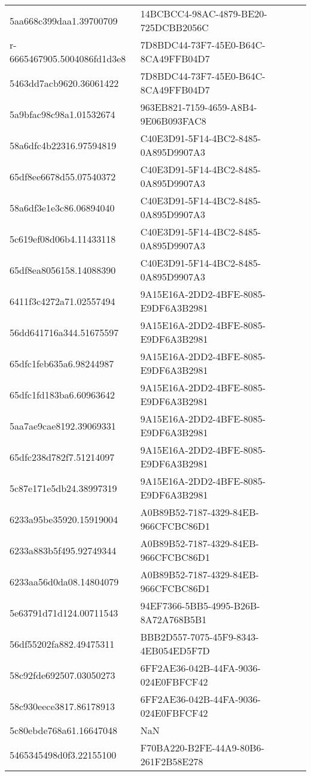 \begin{tabular}{ll}
5aa668c399daa1.39700709 & 14BCBCC4-98AC-4879-BE20-725DCBB2056C \\
r-6665467905.5004086fd1d3e8 & 7D8BDC44-73F7-45E0-B64C-8CA49FFB04D7 \\
5463dd7acb9620.36061422 & 7D8BDC44-73F7-45E0-B64C-8CA49FFB04D7 \\
5a9bfac98c98a1.01532674 & 963EB821-7159-4659-A8B4-9E06B093FAC8 \\
58a6dfc4b22316.97594819 & C40E3D91-5F14-4BC2-8485-0A895D9907A3 \\
65df8ee6678d55.07540372 & C40E3D91-5F14-4BC2-8485-0A895D9907A3 \\
58a6df3e1e3c86.06894040 & C40E3D91-5F14-4BC2-8485-0A895D9907A3 \\
5c619ef08d06b4.11433118 & C40E3D91-5F14-4BC2-8485-0A895D9907A3 \\
65df8ea8056158.14088390 & C40E3D91-5F14-4BC2-8485-0A895D9907A3 \\
6411f3c4272a71.02557494 & 9A15E16A-2DD2-4BFE-8085-E9DF6A3B2981 \\
56dd641716a344.51675597 & 9A15E16A-2DD2-4BFE-8085-E9DF6A3B2981 \\
65dfc1feb635a6.98244987 & 9A15E16A-2DD2-4BFE-8085-E9DF6A3B2981 \\
65dfc1fd183ba6.60963642 & 9A15E16A-2DD2-4BFE-8085-E9DF6A3B2981 \\
5aa7ae9cae8192.39069331 & 9A15E16A-2DD2-4BFE-8085-E9DF6A3B2981 \\
65dfc238d782f7.51214097 & 9A15E16A-2DD2-4BFE-8085-E9DF6A3B2981 \\
5c87e171e5db24.38997319 & 9A15E16A-2DD2-4BFE-8085-E9DF6A3B2981 \\
6233a95be35920.15919004 & A0B89B52-7187-4329-84EB-966CFCBC86D1 \\
6233a883b5f495.92749344 & A0B89B52-7187-4329-84EB-966CFCBC86D1 \\
6233aa56d0da08.14804079 & A0B89B52-7187-4329-84EB-966CFCBC86D1 \\
5e63791d71d124.00711543 & 94EF7366-5BB5-4995-B26B-8A72A768B5B1 \\
56df55202fa882.49475311 & BBB2D557-7075-45F9-8343-4EB054ED5F7D \\
58c92fde692507.03050273 & 6FF2AE36-042B-44FA-9036-024E0FBFCF42 \\
58c930eece3817.86178913 & 6FF2AE36-042B-44FA-9036-024E0FBFCF42 \\
5c80ebde768a61.16647048 & NaN \\
5465345498d0f3.22155100 & F70BA220-B2FE-44A9-80B6-261F2B58E278 \\

\end{tabular}
